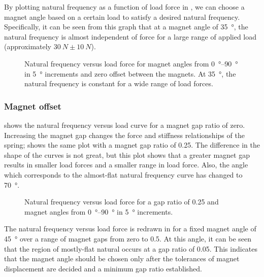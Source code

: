 By plotting natural frequency as a function of load force in , we can choose a magnet angle based on a certain load to satisfy a desired natural frequency. Specifically, it can be seen from this graph that at a magnet angle of \SI{35}{\degree}, the natural frequency is almost independent of force for a large range of applied load (approximately $\SI{30}{N}\pm\SI{10}{N}$).

\begin{figure}
\centering
{}
\caption{Natural frequency versus load force for magnet angles from \SIrange{0}{90}{\degree} in \SI{5}{\degree} increments and zero offset between the magnets. At \SI{35}{\degree}, the natural frequency is constant for a wide range of load forces.}
\end{figure}

\subsubsection{Magnet offset}

 shows the natural frequency versus load curve for a magnet gap ratio of zero. Increasing the magnet gap changes the force and stiffness relationships of the spring;  shows the same plot with a magnet gap ratio of \num{0.25}. The difference in the shape of the curves is not great, but this plot shows that a greater magnet gap results in smaller load forces and a smaller range in load force. Also, the angle which corresponds to the almost-flat natural frequency curve has changed to \SI{70}{\degree}.

\begin{figure}
\centering
{}
\caption{Natural frequency versus load force for a gap ratio of \num{0.25} and magnet angles from \SIrange{0}{90}{\degree} in \SI{5}{\degree} increments.}
\end{figure}

The natural frequency versus load force is redrawn in  for a fixed magnet angle of \SI{45}{\degree} over a range of magnet gaps from zero to \num{0.5}. At this angle, it can be seen that the region of mostly-flat natural occurs at a gap ratio of \num{0.05}. This indicates that the magnet angle should be chosen only after the tolerances of magnet displacement are decided and a minimum gap ratio established.

